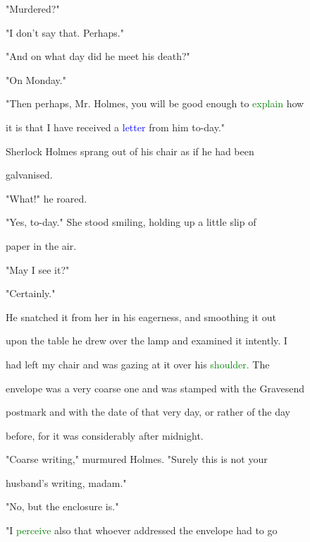  \textcolor{BurntOrange}{"Murdered?"}



 "I don't say that. Perhaps."



 "And on what day did he meet his \textcolor{BurntOrange}{death?"}



 "On Monday."



 "Then perhaps, Mr. Holmes, you will be \textcolor{BurntOrange}{good} enough to \textcolor{green}{explain} how

 it is that I have received a \textcolor{blue}{letter} from him to-day."



 Sherlock Holmes sprang out of his chair as if he had been

 galvanised.



 "What!" he roared.



 "Yes, to-day." She stood \textcolor{BurntOrange}{smiling,} holding up a little \textcolor{BurntOrange}{slip} of

 paper in the air.



 "May I see it?"



 "Certainly."



 He snatched it from her in his \textcolor{BurntOrange}{eagerness,} and smoothing it out

 upon the table he drew over the lamp and examined it intently. I

 had left my chair and was gazing at it over his \textcolor{green}{shoulder.} The

 envelope was a very coarse one and was stamped with the Gravesend

 postmark and with the date of that very day, or rather of the day

 before, for it was considerably after midnight.



 "Coarse writing," murmured Holmes. "Surely this is not your

 husband's writing, madam."



 "No, but the enclosure is."



 "I \textcolor{green}{perceive} also that whoever addressed the envelope had to go

